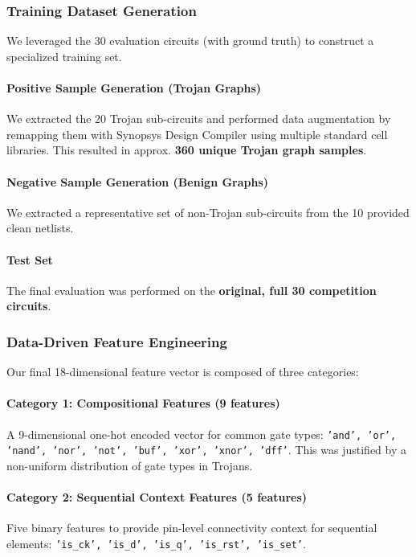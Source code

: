 \documentclass[conference]{IEEEtran}
\begin{document}
\subsubsection{Training Dataset Generation}
We leveraged the 30 evaluation circuits (with ground truth) to construct a specialized training set.
\paragraph{Positive Sample Generation (Trojan Graphs)}
We extracted the 20 Trojan sub-circuits and performed data augmentation by remapping them with Synopsys Design Compiler using multiple standard cell libraries. This resulted in approx. \textbf{360 unique Trojan graph samples}.
\paragraph{Negative Sample Generation (Benign Graphs)}
We extracted a representative set of non-Trojan sub-circuits from the 10 provided clean netlists.
\paragraph{Test Set}
The final evaluation was performed on the \textbf{original, full 30 competition circuits}.

\subsubsection{Data-Driven Feature Engineering}
Our final 18-dimensional feature vector is composed of three categories:
\paragraph{Category 1: Compositional Features (9 features)}
A 9-dimensional one-hot encoded vector for common gate types: \texttt{'and', 'or', 'nand', 'nor', 'not', 'buf', 'xor', 'xnor', 'dff'}. This was justified by a non-uniform distribution of gate types in Trojans.
\paragraph{Category 2: Sequential Context Features (5 features)}
Five binary features to provide pin-level connectivity context for sequential elements: \texttt{'is\_ck', 'is\_d', 'is\_q', 'is\_rst', 'is\_set'}.
\end{document}
